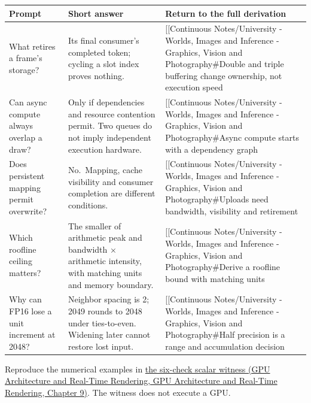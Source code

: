 {\def\LTcaptype{none} %
\begin{longtable}[]{@{}
  >{\raggedright\arraybackslash}p{}
  >{\raggedright\arraybackslash}p{}
  >{\raggedright\arraybackslash}p{}@{}}
\toprule\noalign{}
\begin{minipage}[b]{\linewidth}\raggedright
Prompt
\end{minipage} & \begin{minipage}[b]{\linewidth}\raggedright
Short answer
\end{minipage} & \begin{minipage}[b]{\linewidth}\raggedright
Return to the full derivation
\end{minipage} \\
\midrule\noalign{}
\endhead
\bottomrule\noalign{}
\endlastfoot
What retires a frame's storage? & Its final consumer's completed token; cycling a slot index proves nothing. & {[}{[}Continuous Notes/University - Worlds, Images and Inference - Graphics, Vision and Photography\#Double and triple buffering change ownership, not execution speed \\
Can async compute always overlap a draw? & Only if dependencies and resource contention permit. Two queues do not imply independent execution hardware. & {[}{[}Continuous Notes/University - Worlds, Images and Inference - Graphics, Vision and Photography\#Async compute starts with a dependency graph \\
Does persistent mapping permit overwrite? & No.~Mapping, cache visibility and consumer completion are different conditions. & {[}{[}Continuous Notes/University - Worlds, Images and Inference - Graphics, Vision and Photography\#Uploads need bandwidth, visibility and retirement \\
Which roofline ceiling matters? & The smaller of arithmetic peak and bandwidth × arithmetic intensity, with matching units and memory boundary. & {[}{[}Continuous Notes/University - Worlds, Images and Inference - Graphics, Vision and Photography\#Derive a roofline bound with matching units \\
Why can FP16 lose a unit increment at 2048? & Neighbor spacing is 2; 2049 rounds to 2048 under ties-to-even. Widening later cannot restore lost input. & {[}{[}Continuous Notes/University - Worlds, Images and Inference - Graphics, Vision and Photography\#Half precision is a range and accumulation decision \\
\end{longtable}
}

Reproduce the numerical examples in \href{../06-GPU-Architecture-and-Real-Time-Rendering/main.pdf\#nameddest=03-visual-computing-i-ch016-check-the-scheduling-and-precision-examples-with-a-scalar-witness}{the six-check scalar witness (GPU Architecture and Real-Time Rendering, GPU Architecture and Real-Time Rendering, Chapter 9)}. The witness does not execute a GPU.
